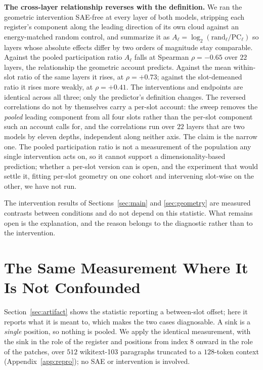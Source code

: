 \documentclass{article}
\begin{document}
\textbf{The cross-layer relationship reverses with the definition.} We ran the geometric intervention SAE-free at every layer of both models, stripping each register's component along the leading direction of its own cloud against an energy-matched random control, and summarize it as $A_\ell = \log_2(\text{rand}_\ell/\text{PC}_\ell)$ so layers whose absolute effects differ by two orders of magnitude stay comparable. Against the pooled participation ratio $A_\ell$ falls at Spearman $\rho = -0.65$ over $22$ layers, the relationship the geometric account predicts. Against the mean within-slot ratio of the same layers it rises, at $\rho = +0.73$; against the slot-demeaned ratio it rises more weakly, at $\rho = +0.41$. The interventions and endpoints are identical across all three; only the predictor's definition changes. The reversed correlations do not by themselves carry a per-slot account: the sweep removes the \emph{pooled} leading component from all four slots rather than the per-slot component such an account calls for, and the correlations run over $22$ layers that are two models by eleven depths, independent along neither axis. The claim is the narrow one. The pooled participation ratio is not a measurement of the population any single intervention acts on, so it cannot support a dimensionality-based prediction; whether a per-slot version can is open, and the experiment that would settle it, fitting per-slot geometry on one cohort and intervening slot-wise on the other, we have not run.

The intervention results of Sections~\ref{sec:main} and \ref{sec:geometry} are measured contrasts between conditions and do not depend on this statistic. What remains open is the explanation, and the reason belongs to the diagnostic rather than to the intervention.

\section{The Same Measurement Where It Is Not Confounded}
\label{sec:generality}

Section~\ref{sec:artifact} shows the statistic reporting a between-slot offset; here it reports what it is meant to, which makes the two cases diagnosable. A sink is a \emph{single} position, so nothing is pooled. We apply the identical measurement, with the sink in the role of the register and positions from index 8 onward in the role of the patches, over $512$ wikitext-103 paragraphs truncated to a $128$-token context (Appendix~\ref{app:repro}); no SAE or intervention is involved.
\end{document}
